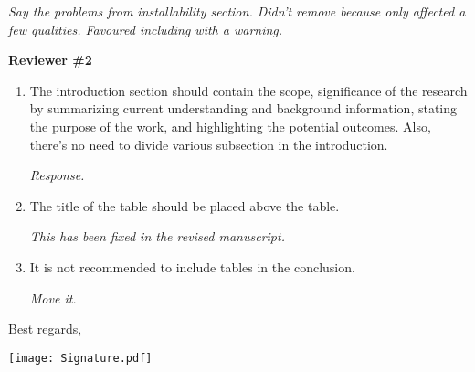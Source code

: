 \documentclass[12pt]{casletter}
\begin{document}
\begin{letter}
\begin{enumerate}
  \emph{Say the problems from installability section.  Didn't remove because
  only affected a few qualities.  Favoured including with a warning.
  \smallskip}

  \end{enumerate}

  \textbf{Reviewer \#2}

  \begin{enumerate}
  
  \item The introduction section should contain the scope, significance of the
  research by summarizing current understanding and background information,
  stating the purpose of the work, and highlighting the potential outcomes.
  Also, there's no need to divide various subsection in the introduction.
  \medskip

  \emph{Response.\smallskip}

  \item The title of the table should be placed above the table. \medskip

  \emph{This has been fixed in the revised manuscript.  \smallskip}

  \item It is not recommended to include tables in the conclusion. \medskip

  \emph{Move it.  \smallskip}

  \end{enumerate}

  \closing{Best regards,~\newline} \vspace{-29mm}
  \texttt{[image: Signature.pdf]}

\end {letter}
\end{document}
